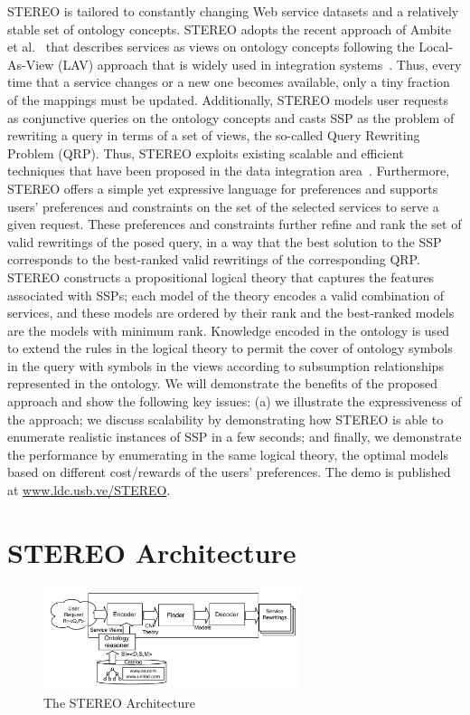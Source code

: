 \documentclass{llncs}
\begin{document}
 STEREO is tailored to constantly changing Web service datasets and a relatively stable set of ontology concepts. STEREO adopts  the recent approach of Ambite et al.\ \cite{AmbiteISWC09}
that describes services as views on ontology concepts following the Local-As-View (LAV) approach that is widely used in integration
systems~\cite{levy:bucket}. Thus, every time that a service changes or
a new one becomes available, only a tiny fraction of the mappings
must be updated. Additionally,   STEREO models user requests  as conjunctive queries on the ontology concepts and casts  SSP  as the problem
of rewriting a query in terms of a set of views, the so-called Query
Rewriting Problem (QRP). Thus, STEREO exploits existing scalable and efficient techniques that have been proposed in the data integration area~\cite{arvelo:aaai06,levy:bucket,pottinger:minicon}.
Furthermore, STEREO offers a simple yet expressive language for preferences and supports users' preferences and constraints on the set of the
selected services to serve a given request. 
These preferences and constraints further refine and rank 
the set of valid rewritings of the posed query, in a way that
the best solution to the SSP corresponds to the best-ranked 
valid rewritings of the corresponding QRP. STEREO  constructs a propositional logical theory  that captures 
the features associated with SSPs; each model of the theory encodes a valid combination of services, and these models are ordered by their rank and the best-ranked
models are the models with minimum rank. Knowledge encoded in the ontology is used to extend the rules in the logical theory to permit the cover of ontology symbols in
the query with symbols in the views according to subsumption relationships represented in the ontology. 
We will demonstrate the benefits of the proposed approach and show the following key issues: (a) we illustrate the expressiveness of the approach; we discuss scalability  by demonstrating how STEREO is able to enumerate realistic instances of SSP in a few seconds; and finally, we demonstrate the performance  by enumerating in the same logical theory, the optimal models based on different cost/rewards of the users' preferences.  The demo is published at \url{www.ldc.usb.ve/STEREO}.
 
\section{STEREO Architecture}
\begin{figure}[t]
\centering
\includegraphics[height=30mm,width=.6\textwidth]{architecture.pdf}
\caption{The STEREO Architecture}
\label{fig:architecture}
\end{figure}
\end{document}
